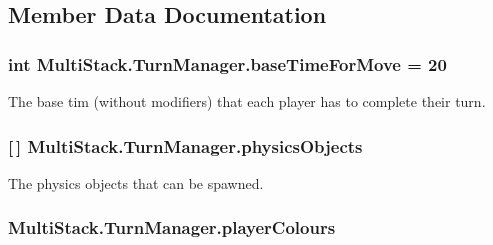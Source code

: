 \subsection{Member Data Documentation}
\hypertarget{class_multi_stack_1_1_turn_manager_aac198a78f07eea0eae4e12fe100ea043}{}
\subsubsection[{base\+Time\+For\+Move}]{\setlength{\rightskip}{0pt plus 5cm}int Multi\+Stack.\+Turn\+Manager.\+base\+Time\+For\+Move = 20}\label{class_multi_stack_1_1_turn_manager_aac198a78f07eea0eae4e12fe100ea043}


The base tim (without modifiers) that each player has to complete their turn. 

\hypertarget{class_multi_stack_1_1_turn_manager_a4c217abcf3dd22bc5aa3908aa68c0df3}{}
\subsubsection[{physics\+Objects}]{ \mbox{[}$\,$\mbox{]} Multi\+Stack.\+Turn\+Manager.\+physics\+Objects}\label{class_multi_stack_1_1_turn_manager_a4c217abcf3dd22bc5aa3908aa68c0df3}


The physics objects that can be spawned. 

\hypertarget{class_multi_stack_1_1_turn_manager_a21fba5ca2fc616a5f1dde0676ba9f5f2}{}
\subsubsection[{player\+Colours}]{ Multi\+Stack.\+Turn\+Manager.\+player\+Colours}\label{class_multi_stack_1_1_turn_manager_a21fba5ca2fc616a5f1dde0676ba9f5f2}


